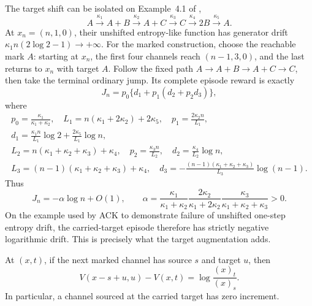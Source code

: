 \begin{remark}\label{rem:ack-example}
The target shift can be isolated on Example~4.1 of
\citet{AndersonCappellettiKim2020},
\[
 A\xrightarrow{\kappa_1}A+B\xrightarrow{\kappa_2}A+C
 \xrightarrow{\kappa_3}C\xrightarrow{\kappa_4}2B
 \xrightarrow{\kappa_5}A.
\]
At \(x_n=(n,1,0)\), their unshifted entropy-like function has generator
drift \(\kappa_1n(2\log2-1)\to+\infty\).  For the marked construction,
choose the reachable mark \(A\): starting at \(x_n\), the first four channels
reach \((n-1,3,0)\), and the last returns to \(x_n\) with target \(A\).
Follow the fixed path \(A\to A+B\to A+C\to C\), then take the terminal
ordinary jump.  Its complete episode reward is exactly
\begin{equation}\label{eq:ack-episode}
 J_n=p_0\{d_1+p_1(d_2+p_2d_3)\},
\end{equation}
where
\[
\begin{gathered}
 p_0=\frac{\kappa_1}{\kappa_1+\kappa_2},\quad
 L_1=n(\kappa_1+2\kappa_2)+2\kappa_5,\quad
 p_1=\frac{2\kappa_2n}{L_1},\\
 d_1=\frac{\kappa_1n}{L_1}\log2
       +\frac{2\kappa_5}{L_1}\log n,\\
 L_2=n(\kappa_1+\kappa_2+\kappa_3)+\kappa_4,\quad
 p_2=\frac{\kappa_3n}{L_2},\quad
 d_2=\frac{\kappa_4}{L_2}\log n,\\
 L_3=(n-1)(\kappa_1+\kappa_2+\kappa_3)+\kappa_4,\quad
 d_3=-\frac{(n-1)(\kappa_1+\kappa_2+\kappa_3)}{L_3}\log(n-1).
\end{gathered}
\]
Thus
\[
 J_n=-\alpha\log n+O(1),\qquad
 \alpha=\frac{\kappa_1}{\kappa_1+\kappa_2}
        \frac{2\kappa_2}{\kappa_1+2\kappa_2}
        \frac{\kappa_3}{\kappa_1+\kappa_2+\kappa_3}>0.
\]
On the example used by ACK to demonstrate failure of unshifted one-step
entropy drift, the carried-target episode therefore has strictly negative
logarithmic drift.  This is precisely what the target augmentation adds.
\end{remark}

\begin{lemma}\label{lem:identity}
At \((x,t)\), if the next marked channel has source \(s\) and target \(u\),
then
\begin{equation}\label{eq:identity}
  V(x-s+u,u)-V(x,t)=\log\frac{(x)_t}{(x)_s}.
\end{equation}
In particular, a channel sourced at the carried target has zero increment.
\end{lemma}

